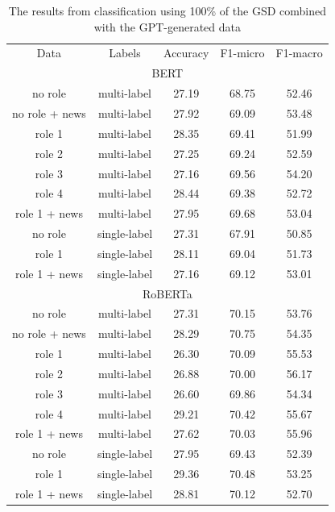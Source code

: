 \documentclass[manuscript]{clv3}
\begin{document}
\begin{table} [hbt!]
    \centering
    \begin{tabular}{ccccc}
             Data&  Labels&  Accuracy& F1-micro& F1-macro  \\
 \multicolumn{5}{c}{BERT}\\
             no role&  multi-label&  27.19&   68.75& 52.46\\
             no role + news&  multi-label&  27.92&   69.09& 53.48\\
             role 1&  multi-label&  28.35&   69.41& 51.99\\
             role 2&  multi-label&  27.25&   69.24& 52.59\\
             role 3&  multi-label&  27.16&   69.56& 54.20\\
     role 4& multi-label& 28.44&  69.38& 52.72\\
     role 1 + news& multi-label& 27.95&  69.68& 53.04\\
     no role& single-label& 27.31&  67.91& 50.85\\
     role 1& single-label& 28.11&  69.04& 51.73\\
     role 1 + news& single-label& 27.16&  69.12& 53.01\\
             \multicolumn{5}{c}{RoBERTa}\\
             no role&  multi-label&  27.31&   70.15& 53.76\\
 no role + news& multi-label& 28.29& 70.75&54.35\\
 role 1& multi-label& 26.30& 70.09&55.53\\
 role 2& multi-label& 26.88& 70.00&56.17\\
 role 3& multi-label& 26.60& 69.86&54.34\\
 role 4& multi-label& 29.21& 70.42&55.67\\
 role 1 + news& multi-label& 27.62& 70.03&55.96\\
 no role & single-label& 27.95& 69.43&52.39\\
 role 1& single-label& 29.36& 70.48&53.25\\
 role 1 + news& single-label& 28.81& 70.12&52.70\\
    \end{tabular}
    \caption{The results from classification using 100\% of the GSD combined with the GPT-generated data}
    \label{tab:full_gsd_results}
\end{table}
\end{document}
